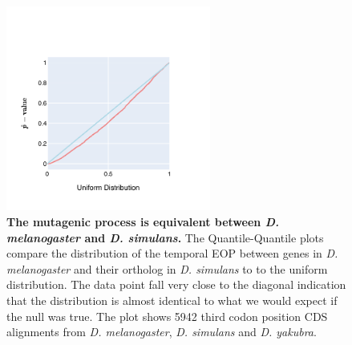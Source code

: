\begin{figure}[htbp]
\centering
\includegraphics[width=0.6\textwidth]{figures/plots/drosophila/temp-EOP-QQ.pdf}
\caption{\textbf{The mutagenic process is equivalent between \textit{D. melanogaster} and \textit{D. simulans}.} The Quantile-Quantile plots compare the distribution of the temporal EOP between genes in \textit{D. melanogaster} and their ortholog in \textit{D. simulans} to  to the uniform distribution. The data point fall very close to the diagonal indication that the distribution is almost identical to what we would expect if the null was true. The plot shows 5942 third codon position CDS alignments from \textit{D. melanogaster}, \textit{D. simulans} and \textit{D. yakubra}. }
\label{fig:drosophila:temp-EOP-qq}
\end{figure}
